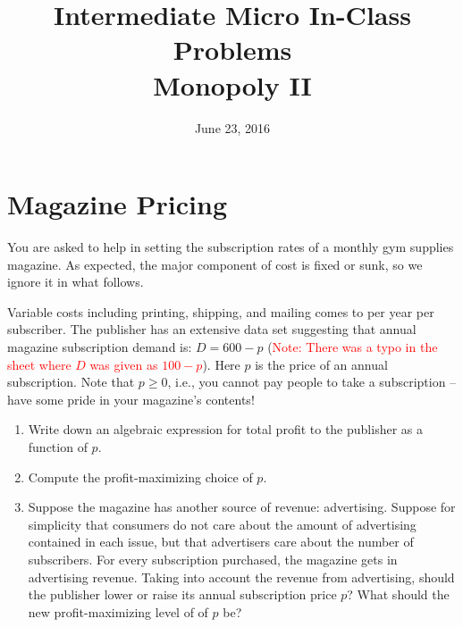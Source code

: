 \documentclass{article}
\begin{document}
\title{Intermediate Micro In-Class Problems \\ \large Monopoly II}

\date{June 23, 2016}

\maketitle

\section*{Magazine Pricing}
You are asked to help in setting the subscription rates of a monthly gym supplies magazine. As expected, the major component of cost is fixed or sunk, so we ignore it in what follows.

Variable costs including printing, shipping, and mailing comes to  per year per subscriber. The publisher has an extensive data set suggesting that annual magazine subscription demand is: $D = 600 - p$ (\textcolor{red}{Note: There was a typo in the sheet where $D$ was given as $100 - p$}). Here $p$ is the price of an annual subscription. Note that $p \geq 0$, i.e., you cannot pay people to take a subscription -- have some pride in your magazine's contents!

\begin{enumerate}
\item Write down an algebraic expression for total profit to the publisher as a function of $p$. 
\item Compute the profit-maximizing choice of $p$.
\item Suppose the magazine has another source of revenue: advertising. Suppose for simplicity that consumers do not care about the amount of advertising contained in each issue, but that advertisers care about the number of subscribers. For every subscription purchased, the magazine gets  in advertising revenue. Taking into account the revenue from advertising, should the publisher lower or raise its annual subscription price $p$? What should the new profit-maximizing level of of $p$ be?
\end{enumerate}
\end{document}
